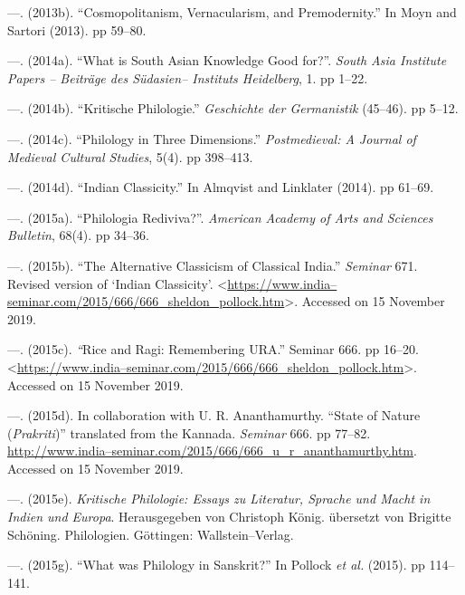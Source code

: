 \begin{thebibliography}{99}
 \item —. (2013b). “Cosmopolitanism, Vernacularism, and Premodernity.” In Moyn and Sartori (2013). pp 59–80.

 \item —. (2014a). “What is South Asian Knowledge Good for?”. \textit{South Asia Institute Papers – Beiträge des Südasien– Instituts Heidelberg}, 1. pp 1–22.

 \item —. (2014b). “Kritische Philologie.” \textit{Geschichte der Germanistik} (45–46). pp 5–12.

 \item —. (2014c). “Philology in Three Dimensions.” \textit{Postmedieval: A Journal of Medieval Cultural Studies}, 5(4). pp 398–413.

 \item —. (2014d). “Indian Classicity.” In Almqvist and Linklater (2014). pp 61–69.

 \item —. (2015a). “Philologia Rediviva?”. \textit{American Academy of Arts and Sciences Bulletin}, 68(4). pp 34–36.

 \item —. (2015b). “The Alternative Classicism of Classical India.” \textit{Seminar} 671. Revised version of ‘Indian Classicity’. \textless \url{https://www.india–seminar.com/2015/666/666_sheldon_pollock.htm}\textgreater . Accessed on 15 November 2019.

 \item —. (2015c).\textit{ “}Rice and Ragi: Remembering URA.” Seminar 666. pp 16–20. \textless \url{https://www.india–seminar.com/2015/666/666_sheldon_pollock.htm}\textgreater . Accessed on 15 November 2019.

 \item —. (2015d). In collaboration with U. R. Ananthamurthy. “State of Nature (\textit{Prakriti})” translated from the Kannada. \textit{Seminar} 666. pp 77–82. \url{http://www.india–seminar.com/2015/666/666_u_r_ananthamurthy.htm}. Accessed on 15 November 2019.

 \item —. (2015e). \textit{Kritische Philologie: Essays zu Literatur, Sprache und Macht in Indien und Europa}. Herausgegeben von Christoph König. übersetzt von Brigitte Schöning. Philologien. Göttingen: Wallstein–Verlag.

 \item —. (2015g). “What was Philology in Sanskrit?” In Pollock \textit{et al.} (2015). pp 114–141.


\end{thebibliography}
